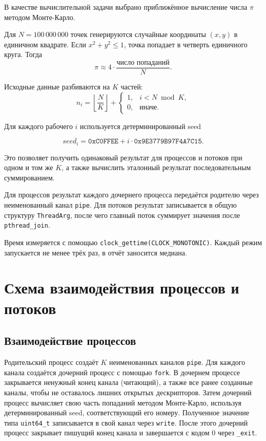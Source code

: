 В качестве вычислительной задачи выбрано приближённое вычисление числа \(\pi\)
методом Монте-Карло.

Для \(N = 100\,000\,000\) точек генерируются случайные координаты \((x, y)\) в
единичном квадрате. Если \(x^2 + y^2 \le 1\), точка попадает в четверть единичного
круга. Тогда
\[
    \pi \approx 4 \cdot \frac{\text{число попаданий}}{N}.
\]

Исходные данные разбиваются на \(K\) частей:
\[
    n_i = \left\lfloor \frac{N}{K} \right\rfloor +
    \begin{cases}
        1, & i < N \bmod K, \\
        0, & \text{иначе}.
    \end{cases}
\]

Для каждого рабочего \(i\) используется детерминированный seed

\[
    seed_i = \texttt{0xC0FFEE} + i \cdot \texttt{0x9E3779B97F4A7C15}.
\]

Это позволяет получить одинаковый результат для процессов и потоков при одном и том
же \(K\), а также вычислить эталонный результат последовательным суммированием.

Для процессов результат каждого дочернего процесса передаётся родителю через
неименованный канал \texttt{pipe}. Для потоков результат записывается в общую
структуру \texttt{ThreadArg}, после чего главный поток суммирует значения после
\texttt{pthread\_join}.

Время измеряется с помощью \texttt{clock\_gettime(CLOCK\_MONOTONIC)}. Каждый режим
запускается не менее трёх раз, в отчёт заносится медиана.

\newpage
\section{Схема взаимодействия процессов и потоков}

\subsection*{Взаимодействие процессов}

Родительский процесс создаёт \(K\) неименованных каналов \texttt{pipe}. Для каждого
канала создаётся дочерний процесс с помощью \texttt{fork}. В дочернем процессе
закрывается ненужный конец канала (читающий), а также все ранее созданные каналы,
чтобы не оставалось лишних открытых дескрипторов. Затем дочерний процесс вычисляет
свою часть попаданий методом Монте-Карло, используя детерминированный seed,
соответствующий его номеру. Полученное значение типа \texttt{uint64\_t} записывается
в свой канал через \texttt{write}. После этого дочерний процесс закрывает пишущий
конец канала и завершается с кодом 0 через \texttt{\_exit}.

